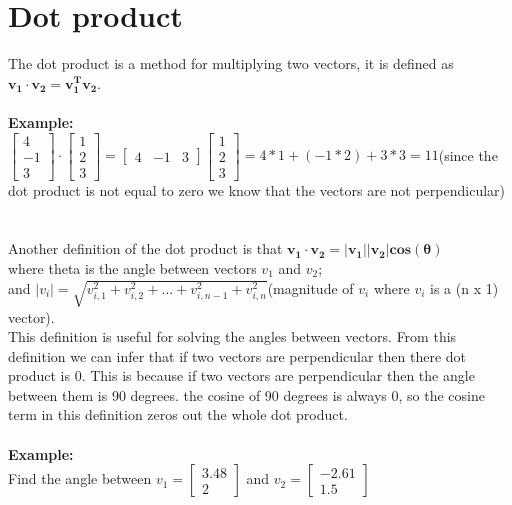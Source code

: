 \documentclass{article}
\begin{document}
\section{Dot product}
The dot product is a method for multiplying two vectors, it is defined as\\ $\mathbf{v_1 \cdot v_2 = v_{1}^T v_{2}}$.\\\\ 
\textbf{Example:} \\
$\begin{bmatrix}
4 \\
-1 \\
3 
\end{bmatrix} \cdot
\begin{bmatrix}
1 \\
2 \\
3 
\end{bmatrix} =
\begin{bmatrix}
4 & -1 & 3 
\end{bmatrix} 
\begin{bmatrix}
1 \\
2 \\
3 
\end{bmatrix}= 4*1 + (-1*2) + 3*3 = 11
$(since the dot product is not equal to zero we know that the vectors are not perpendicular)\\\\\\
Another definition of the dot product is that $\mathbf{v_1 \cdot v_2 = |v_{1}|| v_{2}|cos(\theta)}$\\ where theta is the angle between vectors $v_1$ and $v_2$;\\ and $|v_i|= \sqrt{v_{i,1}^2+v_{i,2}^2+ \dots + v_{i,n-1}^2+v_{i,n}^2}$(magnitude of $v_i$ where $v_i$ is a (n x 1) vector).\\
This definition is useful for solving the angles between vectors. From this definition we can infer that if two vectors are perpendicular then there dot product is 0. This is because if two vectors are perpendicular then the angle between them is 90 degrees. the cosine of 90 degrees is always 0, so the cosine term in this definition zeros out the whole dot product. \\\\
\textbf{Example:} \\
Find the angle between 
$v_1 = \begin{bmatrix}
3.48 \\
2
\end{bmatrix}$ and 
$v_2 = \begin{bmatrix}
-2.61 \\
1.5
\end{bmatrix}$\\\\
\end{document}
